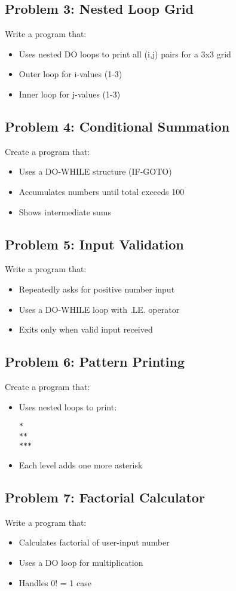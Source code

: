 \documentclass{book}
\begin{document}
\subsection*{Problem 3: Nested Loop Grid}  
Write a program that:  
\begin{itemize}  
\item Uses nested DO loops to print all (i,j) pairs for a 3x3 grid  
\item Outer loop for i-values (1-3)  
\item Inner loop for j-values (1-3)  
\end{itemize}

\subsection*{Problem 4: Conditional Summation}  
Create a program that:  
\begin{itemize}  
\item Uses a DO-WHILE structure (IF-GOTO)  
\item Accumulates numbers until total exceeds 100  
\item Shows intermediate sums  
\end{itemize}

\subsection*{Problem 5: Input Validation}  
Write a program that:  
\begin{itemize}  
\item Repeatedly asks for positive number input  
\item Uses a DO-WHILE loop with .LE. operator  
\item Exits only when valid input received  
\end{itemize}

\subsection*{Problem 6: Pattern Printing}  
Create a program that:  
\begin{itemize}  
\item Uses nested loops to print:  
\begin{verbatim}
*
**
***
\end{verbatim}  
\item Each level adds one more asterisk  
\end{itemize}

\subsection*{Problem 7: Factorial Calculator}  
Write a program that:  
\begin{itemize}  
\item Calculates factorial of user-input number  
\item Uses a DO loop for multiplication  
\item Handles 0! = 1 case  
\end{itemize}
\end{document}
